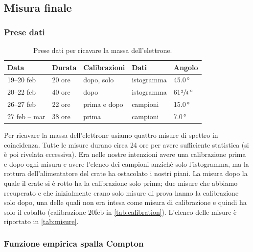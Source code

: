 \subsection{Misura finale}\label{par:fondo2}

\subsubsection{Prese dati}

\begin{table}
	\centering
	\begin{tabular}{lllll}
		\toprule
		Data & Durata & Calibrazioni & Dati & Angolo \\
		\midrule
		19--20 feb    & 20 ore & dopo, solo \co & istogramma &           45.0\,\si{\degree} \\
		20--22 feb    & 40 ore & dopo           & istogramma &   61$\sfrac34$\,\si{\degree} \\
		26--27 feb    & 22 ore & prima e dopo   & campioni   &           15.0\,\si{\degree} \\
		27 feb \!--\! 1 mar & 38 ore & prima          & campioni   & \phantom{1}7.0\,\si{\degree} \\
		\bottomrule
	\end{tabular}
	\caption{\label{tab:misure}
	Prese dati per ricavare la massa dell'elettrone.}
\end{table}

Per ricavare la massa dell'elettrone usiamo quattro misure di spettro in coincidenza.
Tutte le misure durano circa 24 ore per avere sufficiente statistica (si è poi rivelata eccessiva).
Era nelle nostre intenzioni avere una calibrazione prima e dopo ogni misura
e avere l'elenco dei campioni anziché solo l'istogramma,
ma la rottura dell'alimentatore del crate ha ostacolato i nostri piani.
La misura dopo la quale il crate si è rotto ha la calibrazione solo prima;
due misure che abbiamo recuperato e che inizialmente erano solo misure di prova hanno la calibrazione solo dopo,
una delle quali non era intesa come misura di calibrazione e quindi ha solo il cobalto
(calibrazione 20feb in \autoref{tab:calibration}).
L'elenco delle misure è riportato in \autoref{tab:misure}.

\subsubsection{Funzione empirica spalla Compton}
\label{sec:empirical}

